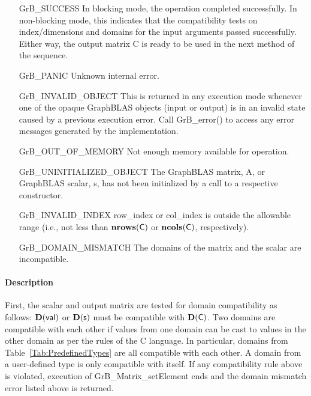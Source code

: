 \begin{itemize}[leftmargin=2.1in]
    \item[{\sf GrB\_SUCCESS}]         In blocking mode, the operation completed
    successfully. In non-blocking mode, this indicates that the compatibility 
    tests on index/dimensions and domains for the input arguments passed successfully. 
    Either way, the output matrix {\sf C} is ready to be used in the next method of 
    the sequence.

    \item[{\sf GrB\_PANIC}]   Unknown internal error.
    
    \item[{\sf GrB\_INVALID\_OBJECT}] This is returned in any execution mode 
    whenever one of the opaque GraphBLAS objects (input or output) is in an invalid 
    state caused by a previous execution error.  Call {\sf GrB\_error()} to access 
    any error messages generated by the implementation.

    \item[{\sf GrB\_OUT\_OF\_MEMORY}]  Not enough memory available for operation.
    
    \item[{\sf GrB\_UNINITIALIZED\_OBJECT}]  The GraphBLAS matrix, {\sf A}, or 
    GraphBLAS scalar, {\sf s}, has not been initialized by a call to a respective constructor.

    \item[{\sf GrB\_INVALID\_INDEX}]  {\sf row\_index} or {\sf col\_index} is 
    outside the allowable range (i.e., not less than $\mathbf{nrows}({\sf C})$ or
    $\mathbf{ncols}({\sf C})$, respectively).

    \item[{\sf GrB\_DOMAIN\_MISMATCH}]  The domains of the matrix and the scalar
    are incompatible.
\end{itemize}

\paragraph{Description}

First, the scalar and output matrix are tested for domain compatibility as follows:  
$\mathbf{D}({\sf val})$ or $\mathbf{D}({\sf s})$ must be compatible with $\mathbf{D}({\sf C})$. Two domains 
are compatible with each other if values from one domain can be cast to values 
in the other domain as per the rules of the C language.  In particular, domains 
from Table~\ref{Tab:PredefinedTypes} are all compatible with each other. A domain 
from a user-defined type is only compatible with itself.  If any compatibility 
rule above is violated, execution of {\sf GrB\_Matrix\_setElement} ends and
the domain mismatch error listed above is returned.

